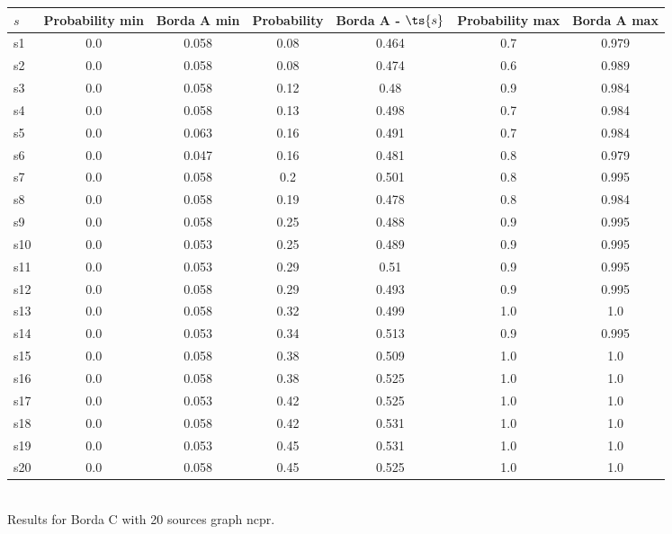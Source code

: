 \documentclass{article}
\begin{document}
\noindent\begin{tabular}{|l|c|c|c|c|c|c|}
\hline
$s$& Probability min & Borda A min & Probability & Borda A - $\ts{s}$ & Probability max & Borda A max\\
\hline
s1 &0.0 & 0.058 & 0.08 & 0.464 & 0.7 & 0.979\\
\hline
s2 &0.0 & 0.058 & 0.08 & 0.474 & 0.6 & 0.989\\
\hline
s3 &0.0 & 0.058 & 0.12 & 0.48 & 0.9 & 0.984\\
\hline
s4 &0.0 & 0.058 & 0.13 & 0.498 & 0.7 & 0.984\\
\hline
s5 &0.0 & 0.063 & 0.16 & 0.491 & 0.7 & 0.984\\
\hline
s6 &0.0 & 0.047 & 0.16 & 0.481 & 0.8 & 0.979\\
\hline
s7 &0.0 & 0.058 & 0.2 & 0.501 & 0.8 & 0.995\\
\hline
s8 &0.0 & 0.058 & 0.19 & 0.478 & 0.8 & 0.984\\
\hline
s9 &0.0 & 0.058 & 0.25 & 0.488 & 0.9 & 0.995\\
\hline
s10 &0.0 & 0.053 & 0.25 & 0.489 & 0.9 & 0.995\\
\hline
s11 &0.0 & 0.053 & 0.29 & 0.51 & 0.9 & 0.995\\
\hline
s12 &0.0 & 0.058 & 0.29 & 0.493 & 0.9 & 0.995\\
\hline
s13 &0.0 & 0.058 & 0.32 & 0.499 & 1.0 & 1.0\\
\hline
s14 &0.0 & 0.053 & 0.34 & 0.513 & 0.9 & 0.995\\
\hline
s15 &0.0 & 0.058 & 0.38 & 0.509 & 1.0 & 1.0\\
\hline
s16 &0.0 & 0.058 & 0.38 & 0.525 & 1.0 & 1.0\\
\hline
s17 &0.0 & 0.053 & 0.42 & 0.525 & 1.0 & 1.0\\
\hline
s18 &0.0 & 0.058 & 0.42 & 0.531 & 1.0 & 1.0\\
\hline
s19 &0.0 & 0.053 & 0.45 & 0.531 & 1.0 & 1.0\\
\hline
s20 &0.0 & 0.058 & 0.45 & 0.525 & 1.0 & 1.0\\
\hline
\end{tabular}\\

\noindent Results for Borda C with 20 sources graph ncpr.
\end{document}
